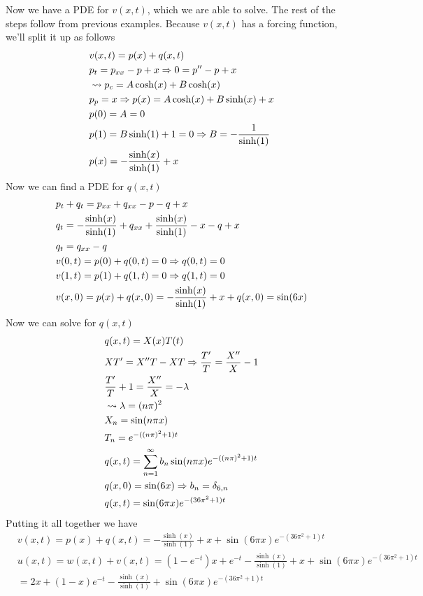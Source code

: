 \documentclass[11pt, fleqn]{article}
\begin{document}
Now we have a PDE for $v(x,t)$, which we are able to solve. The rest of the steps follow from previous examples. Because $v(x,t)$ has a forcing function, we'll split it up as follows
\begin{align*}
    &v(x,t)=p(x)+q(x,t)\\
    &p_t=p_{xx}-p+x\Rightarrow 0=p''-p+x\\
    &\leadsto p_c=A\cosh(x)+B\cosh(x)\\
    &p_p=x\Rightarrow p(x)=A\cosh(x)+B\sinh(x)+x\\
    &p(0)=A=0\\
    &p(1)=B\sinh(1)+1=0\Rightarrow B=-\frac{1}{\sinh(1)}\\
    &p(x)=-\frac{\sinh(x)}{\sinh(1)}+x
\end{align*}
Now we can find a PDE for $q(x,t)$
\begin{align*}
    &p_t+q_t=p_{xx}+q_{xx}-p-q+x\\
    &q_t=-\frac{\sinh(x)}{\sinh(1)}+q_{xx}+\frac{\sinh(x)}{\sinh(1)}-x-q+x\\
    &q_t=q_{xx}-q\\
    &v(0,t)=p(0)+q(0,t)=0\Rightarrow q(0,t)=0\\
    &v(1,t)=p(1)+q(1,t)=0\Rightarrow q(1,t)=0\\
    &v(x,0)=p(x)+q(x,0)=-\frac{\sinh(x)}{\sinh(1)}+x+q(x,0)=\sin(6x)
\end{align*}
Now we can solve for $q(x,t)$
\begin{align*}
    &q(x,t)=X(x)T(t)\\
    &XT'=X''T-XT\Rightarrow \frac{T'}{T}=\frac{X''}{X}-1\\
    &\frac{T'}{T}+1=\frac{X''}{X}=-\lambda\\
    &\leadsto \lambda=(n\pi)^2\\
    &X_n=\sin(n\pi x)\\
    &T_n=e^{-((n\pi)^2+1)t}\\
    &q(x,t)=\sum_{n=1}^\infty b_n\sin(n\pi x)e^{-((n\pi)^2+1)t}\\
    &q(x,0)=\sin(6x)\Rightarrow b_n=\delta_{6,n}\\
    &q(x,t)=\sin(6\pi x)e^{-(36\pi^2+1)t}
\end{align*}
Putting it all together we have
\begin{align*}
    &v(x,t)=p(x)+q(x,t)=-\frac{\sinh(x)}{\sinh(1)}+x+\sin(6\pi x)e^{-(36\pi^2+1)t}\\
    &u(x,t)=w(x,t)+v(x,t)=(1-e^{-t})x+e^{-t}-\frac{\sinh(x)}{\sinh(1)}+x+\sin(6\pi x)e^{-(36\pi^2+1)t}\\
    &=2x+(1-x)e^{-t}-\frac{\sinh(x)}{\sinh(1)}+\sin(6\pi x)e^{-(36\pi^2+1)t}
\end{align*}
\end{document}
